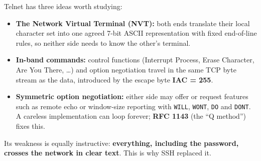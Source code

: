 \documentclass[11pt,a4paper]{article}
\begin{document}
Telnet has three ideas worth studying:
\begin{itemize}[leftmargin=2em]
    \item \textbf{The Network Virtual Terminal (NVT):} both ends translate their local character set into one agreed 7-bit ASCII representation with fixed end-of-line rules, so neither side needs to know the other's terminal.
    \item \textbf{In-band commands:} control functions (Interrupt Process, Erase Character, Are You There, \ldots) and option negotiation travel in the same TCP byte stream as the data, introduced by the escape byte \textbf{IAC = 255}.
    \item \textbf{Symmetric option negotiation:} either side may offer or request features such as remote echo or window-size reporting with \texttt{WILL}, \texttt{WONT}, \texttt{DO} and \texttt{DONT}. A careless implementation can loop forever; \textbf{RFC 1143} (the ``Q method'') fixes this.
\end{itemize}

Its weakness is equally instructive: \textbf{everything, including the password, crosses the network in clear text}. This is why SSH replaced it.
\end{document}
